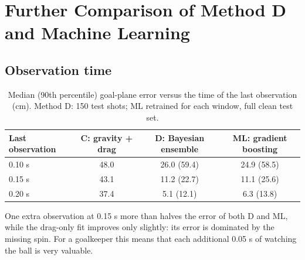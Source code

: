 \section{Further Comparison of Method D and Machine Learning}
\subsection{Observation time}
\begin{table}[H]
\centering
\caption{Median (90th percentile) goal-plane error versus the time of the last observation (cm). Method D: 150 test shots; ML retrained for each window, full clean test set.}
\label{tab:time}
\small
\begin{tabular}{@{}lccc@{}}
\toprule
Last observation & C: gravity + drag & D: Bayesian ensemble & ML: gradient boosting\\
\midrule
0.10 s & 48.0 & 26.0 (59.4) & 24.9 (58.5)\\
0.15 s & 43.1 & 11.2 (22.7) & 11.1 (25.6)\\
0.20 s & 37.4 & \phantom{0}5.1 (12.1) & \phantom{0}6.3 (13.8)\\
\bottomrule
\end{tabular}
\end{table}
One extra observation at 0.15 s more than halves the error of both D and ML, while the drag-only fit improves only slightly: its error is dominated by the missing spin. For a goalkeeper this means that each additional 0.05 s of watching the ball is very valuable.

